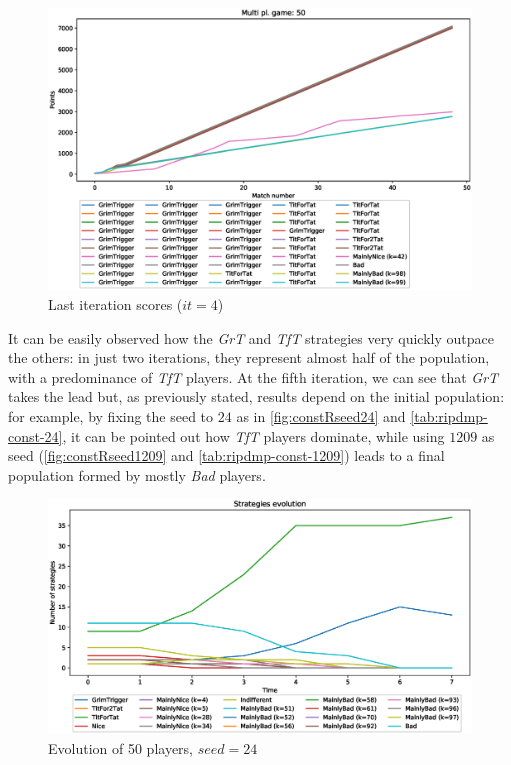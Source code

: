 \documentclass[journal,10pt,twoside]{IEEEtran}
\begin{document}
\begin{figure}[!ht]
    \centering
    \includegraphics[width=1\columnwidth]{../img/ripdmp-const/ripdmp-scores-const-pop-50-r3}
    \caption{Last iteration scores ($it=4$)}
    \label{fig:constLI}
\end{figure}

It can be easily observed how the \textit{GrT} and \textit{TfT} strategies very quickly outpace the others: in just two iterations, they represent almost half of the population, with a predominance of \textit{TfT} players. At the fifth iteration, we can see that \textit{GrT} takes the lead but, as previously stated, results depend on the initial population: for example, by fixing the seed to $24$ as in \autoref{fig:constRseed24} and \autoref{tab:ripdmp-const-24}, it can be pointed out how \textit{TfT} players dominate, while using $1209$ as seed (\autoref{fig:constRseed1209} and \autoref{tab:ripdmp-const-1209}) leads to a final population formed by mostly \textit{Bad} players.

\begin{figure}[!ht]
    \centering
    \includegraphics[width=1\columnwidth]{../img/ripdmp-const/seed24/ripdmp-evolution-const-pop-50}
    \caption{Evolution of 50 players, $seed = 24$}
    \label{fig:constRseed24}
\end{figure}
\end{document}

